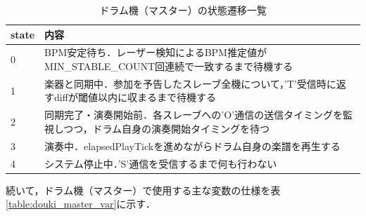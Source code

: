 \begin{table}[H]
    \caption{ドラム機（マスター）の状態遷移一覧}
    \centering
    \label{table:douki_master_state}
    \begin{tabular}{p{1.5cm}p{12cm}}
    \hline
    \textbf{state} & \textbf{内容}\\
    \hline
    0 & BPM安定待ち．レーザー検知によるBPM推定値がMIN\_STABLE\_COUNT回連続で一致するまで待機する\\
    \hline
    1 & 楽器と同期中．参加を予告したスレーブ全機について，'T'受信時に返すdiffが閾値以内に収まるまで待機する\\
    \hline
    2 & 同期完了・演奏開始前．各スレーブへの'O'通信の送信タイミングを監視しつつ，ドラム自身の演奏開始タイミングを待つ\\
    \hline
    3 & 演奏中．elapsedPlayTickを進めながらドラム自身の楽譜を再生する\\
    \hline
    4 & システム停止中．'S'通信を受信するまで何も行わない\\
    \hline
    \end{tabular}
\end{table}

続いて，ドラム機（マスター）で使用する主な変数の仕様を表\ref{table:douki_master_var}に示す．

